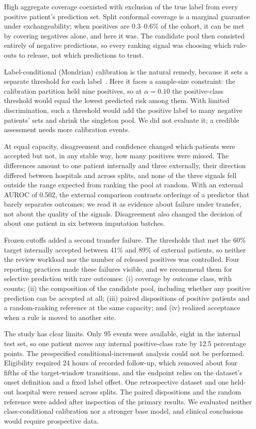 \documentclass[conference]{IEEEtran}
\begin{document}
High aggregate coverage coexisted with exclusion of the true label from every positive patient's prediction set. Split conformal coverage is a marginal guarantee under exchangeability; when positives are 0.3--0.6\% of the cohort, it can be met by covering negatives alone, and here it was. The candidate pool then consisted entirely of negative predictions, so every ranking signal was choosing which rule-outs to release, not which predictions to trust.

Label-conditional (Mondrian) calibration is the natural remedy, because it sets a separate threshold for each label~\cite{vovk2005algorithmic,sadinle2019least}. Here it faces a sample-size constraint: the calibration partition held nine positives, so at $\alpha=0.10$ the positive-class threshold would equal the lowest predicted risk among them. With limited discrimination, such a threshold would add the positive label to many negative patients' sets and shrink the singleton pool. We did not evaluate it; a credible assessment needs more calibration events.

At equal capacity, disagreement and confidence changed which patients were accepted but not, in any stable way, how many positives were missed. The differences amount to one patient internally and three externally, their direction differed between hospitals and across splits, and none of the three signals fell outside the range expected from ranking the pool at random. With an external AUROC of 0.502, the external comparison contrasts orderings of a predictor that barely separates outcomes; we read it as evidence about failure under transfer, not about the quality of the signals. Disagreement also changed the decision of about one patient in six between imputation batches.

Frozen cutoffs added a second transfer failure. The thresholds that met the 60\% target internally accepted between 41\% and 89\% of external patients, so neither the review workload nor the number of released positives was controlled. Four reporting practices made these failures visible, and we recommend them for selective prediction with rare outcomes: (i) coverage by outcome class, with counts; (ii) the composition of the candidate pool, including whether any positive prediction can be accepted at all; (iii) paired dispositions of positive patients and a random-ranking reference at the same capacity; and (iv) realized acceptance when a rule is moved to another site.

The study has clear limits. Only 95 events were available, eight in the internal test set, so one patient moves any internal positive-class rate by 12.5 percentage points. The prespecified conditional-increment analysis could not be performed. Eligibility required 24 hours of recorded follow-up, which removed about four fifths of the target-window transitions, and the endpoint relies on the dataset's onset definition and a fixed label offset. One retrospective dataset and one held-out hospital were reused across splits. The paired dispositions and the random reference were added after inspection of the primary results. We evaluated neither class-conditional calibration nor a stronger base model, and clinical conclusions would require prospective data.
\end{document}
